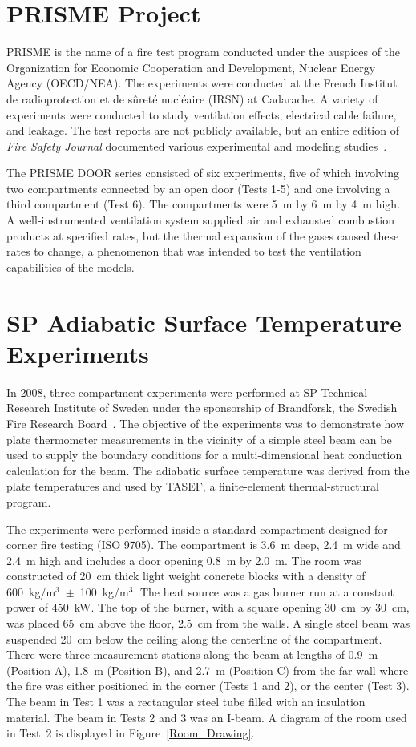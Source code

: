 \section{PRISME Project}

PRISME is the name of a fire test program conducted under the auspices of the Organization for Economic Cooperation and Development, Nuclear Energy Agency (OECD/NEA). The experiments were conducted at the French Institut de radioprotection et de s\^{u}ret\'{e} nucl\'{e}aire (IRSN) at Cadarache. A variety of experiments were conducted to study ventilation effects, electrical cable failure, and leakage. The test reports are not publicly available, but an entire edition of {\em Fire Safety Journal} documented various experimental and modeling studies~\cite{Audouin:FSJ}.

The PRISME DOOR series consisted of six experiments, five of which involving two compartments connected by an open door (Tests 1-5) and one involving a third compartment (Test 6). The compartments were 5~m by 6~m by 4~m high. A well-instrumented ventilation system supplied air and exhausted combustion products at specified rates, but the thermal expansion of the gases caused these rates to change, a phenomenon that was intended to test the ventilation capabilities of the models.

\section{SP Adiabatic Surface Temperature Experiments}

In 2008, three compartment experiments were performed at SP Technical Research Institute of Sweden under the sponsorship of Brandforsk, the Swedish Fire Research Board~\cite{Wickstrom_AST}. The objective of the experiments was to demonstrate how plate thermometer measurements in the vicinity of a simple steel beam can be used to supply the boundary conditions for a multi-dimensional heat conduction calculation for the beam. The adiabatic surface temperature was derived from the plate temperatures and used by TASEF, a finite-element
thermal-structural program.

The experiments were performed inside a standard compartment designed for corner fire testing (ISO 9705). The compartment is 3.6~m deep, 2.4~m wide and 2.4~m high and includes a door opening 0.8~m by 2.0~m. The room was constructed of 20~cm thick light weight concrete blocks with a density of 600~kg/m$^3$~$\pm$~100~kg/m$^3$. The heat source was a gas burner run at a constant power of 450~kW. The top of the burner, with a square opening 30~cm by 30~cm, was placed 65~cm above the floor, 2.5~cm from the walls. A single steel beam was suspended 20~cm below the ceiling along the centerline of the compartment. There were three measurement stations along the beam at lengths of 0.9~m (Position A), 1.8~m (Position B), and 2.7~m (Position C) from the far wall where the fire was either positioned in the corner (Tests 1 and 2), or the center (Test 3). The beam in Test 1 was a rectangular steel tube filled with an insulation material. The beam in Tests 2 and 3 was an I-beam.  A diagram of the room used in Test~2 is displayed in Figure~\ref{Room_Drawing}.

